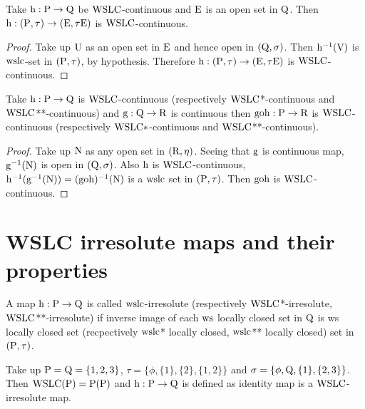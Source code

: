 \begin{thm}\label{thm7.3.7}
Take $\mathrm{h} : \mathrm{P} \to \mathrm{Q}$ be $\mathrm{WSLC}$-continuous and $\mathrm{E}$ is an open set in $\mathrm{Q}$. Then $\mathrm{h} : (\mathrm{P}, \tau) \to (\mathrm{E}, \tau \mathrm{E})$ is $\mathrm{WSLC}$-continuous.
\end{thm}

\begin{proof}
Take up $\mathrm{U}$ as an open set in $\mathrm{E}$ and hence open in $(\mathrm{Q}, \sigma)$. Then $\mathrm{h}^{-1} (\mathrm{V})$ is $\mathrm{ws}\mathrm{lc}$-set in $(\mathrm{P}, \tau)$, by hypothesis. Therefore $\mathrm{h} : (\mathrm{P}, \tau) \to (\mathrm{E}, \tau \mathrm{E})$ is $\mathrm{WSLC}$-continuous.
\end{proof}

\begin{thm}\label{thm7.3.8}
Take $\mathrm{h}: \mathrm{P} \to \mathrm{Q}$ is $\mathrm{WSLC}$-continuous (respectively $\mathrm{WSLC}$*-{\break}continuous and $\mathrm{WSLC}${*}{*}-continuous) and $\mathrm{g}: \mathrm{Q} \to \mathrm{R}$ is continuous then $\mathrm{goh} : \mathrm{P} \to \mathrm{R}$ is $\mathrm{WSLC}$-continuous (respectively $\mathrm{WSLC}*$-continuous and $\mathrm{WSLC}${*}{*}-continuous).
\end{thm}

\begin{proof}
Take up $\mathrm{N}$ as any open set in $(\mathrm{R}, \eta)$. Seeing that $\mathrm{g}$ is continuous map, $\mathrm{g}^{-1} (\mathrm{N})$ is open in $(\mathrm{Q}, \sigma)$. Also $\mathrm{h}$ is $\mathrm{WSLC}$-continuous, $\mathrm{h}^{-1} (\mathrm{g}^{-1} (\mathrm{N})) = (\mathrm{goh})^{-1} (\mathrm{N})$ is a $\mathrm{ws}\mathrm{lc}$ set in $(\mathrm{P}, \tau)$. Then $\mathrm{goh}$ is $\mathrm{WSLC}$-continuous.
\end{proof}

\section{WSLC irresolute maps and their properties}\label{sec7.4}

\begin{dfn}\label{defi7.4.1}
A map $\mathrm{h}: \mathrm{P} \to \mathrm{Q}$ is called $\mathrm{ws}\mathrm{lc}$-irresolute (respectively $\mathrm{WSLC}$*-irresolute, $\mathrm{WSLC}${*}{*}-irresolute) if inverse image of each $\mathrm{ws}$ locally closed set in $\mathrm{Q}$ is ws locally closed set (recpectively $\mathrm{ws}\mathrm{lc}${*} locally closed, $\mathrm{ws}\mathrm{lc}${*}{*} locally closed) set in $(\mathrm{P}, \tau)$.
\end{dfn}

\begin{exm}\label{exam7.4.1}
Take up $\mathrm{P} = \mathrm{Q} = \{1,2, 3\}$, $\tau = \{\phi, \{1\}, \{2\}, \{1,2\}\}$ and $\sigma = \{\phi, \mathrm{Q}, \{1\}, \{2, 3\}\}$. Then $\mathrm{WSLC}(\mathrm{P}) = \mathrm{P} (\mathrm{P})$ and $\mathrm{h}: \mathrm{P} \to \mathrm{Q}$ is defined as identity map is a $\mathrm{WSLC}$-irresolute map.
\end{exm}

